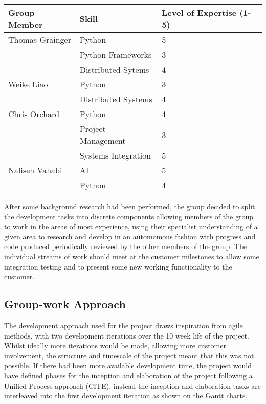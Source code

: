 \begin{center}
\begin{tabularx}{\linewidth}{|XXX|}
\hline
Group Member & Skill & Level of Expertise (1-5) \\ \hline
Thomas Grainger & Python & 5 \\
& Python Frameworks & 3 \\
& Distributed Sytems & 4 \\
Weike Liao & Python & 3 \\
& Distributed Systems & 4 \\
Chris Orchard & Python & 4 \\
& Project Management & 3 \\
& Systems Integration & 5 \\
Nafiseh Vahabi & AI & 5 \\
& Python & 4 \\
\hline
\end{tabularx}
\end{center}

After some background research had been performed, the group decided to split
the development tasks into discrete components allowing members of the group to
work in the areas of most experience, using their specialist understanding of a
given area to research and develop in an automomous fashion with progress and
code produced periodically reviewed by the other members of the group. The
individual streams of work should meet at the customer milestones to allow some
integration testing and to present some new working functionality to the
customer.

\subsection{Group-work Approach}
The development approach used for the project draws inspiration from agile
methods, with two
development iterations over the 10 week life of the project. Whilst ideally more
iterations would be made, allowing more customer involvement, the
structure and timescale of the project meant that this was not possible. If
there had been more available development time, the project would have defined
phases for the inception and elaboration of the project following a Unified
Process approach (CITE), instead the inception and elaboration tasks are
interleaved into the first development iteration as shown on the Gantt charts. 

